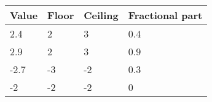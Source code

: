 \begin{figure}[H]
\centering
\begin{tabular}{|l|l|l|l|}
\hline
\textbf{Value}  & \textbf{Floor} & \textbf{Ceiling} & \textbf{Fractional part} \\ \hline
2.4	            & 2	            & 3	              & 0.4                      \\ \hline
2.9	            & 2	            & 3	              & 0.9                      \\ \hline
-2.7	            & -3	            & -2	              & 0.3                      \\ \hline
-2	            & -2	            & -2	              & 0                        \\ \hline
\end{tabular}
\end{figure}

